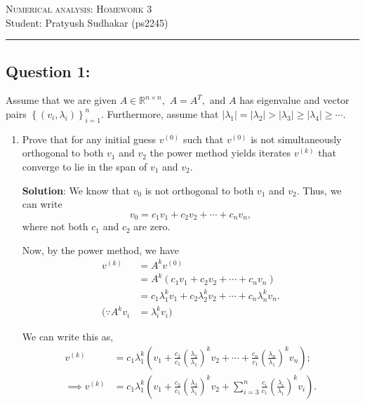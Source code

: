\documentclass[11pt,onecolumn]{article}
\begin{document}
\noindent
\textsc{\Large Numerical analysis: Homework 3}\\
Student: Pratyush Sudhakar (ps2245)\\
\hrule
\noindent

\subsection*{Question 1:}
Assume that we are given $A\in\mathbb{R}^{n\times n},$ $A=A^T,$ and $A$ has eigenvalue and vector pairs $\left\{(v_i,\lambda_i)\right\}_{i=1}^n.$ Furthermore, assume that $\lvert\lambda_1\rvert = \lvert\lambda_2\rvert > \lvert \lambda_3\rvert \geq \lvert\lambda_4\rvert \geq \cdots.$

\begin{enumerate}[label=(\alph*)]
    \item Prove that for any initial guess $v^{(0)}$ such that $v^{(0)}$ is not simultaneously orthogonal to both $v_1$ and $v_2$ the power method yields iterates $v^{(k)}$ that converge to lie in the span of $v_1$ and $v_2.$
          
          \textbf{Solution}:
          We know that $v_0$ is not orthogonal to both $v_1$ and $v_2$. Thus, we can write $$v_0 = c_1v_1 + c_2v_2 + \cdots + c_nv_n,$$ where not both $c_1$ and $c_2$ are zero.
          
          Now, by the power method, we have 
          \begin{align*}
              v^{(k)}          & = A^kv^{(0)}                                                          \\
                               & = A^k(c_1v_1 + c_2v_2 + \cdots + c_nv_n)                              \\
                               & = c_1\lambda_1^kv_1 + c_2\lambda_2^kv_2 + \cdots + c_n\lambda_n^kv_n. \\
              (\because A^kv_i & = \lambda_i^kv_i)                                              
          \end{align*}
          
          We can write this as,
          \begin{align*}
              v^{(k)}          & = c_1\lambda_1^k\left(v_1 + \frac{c_2}{c_1}\left(\frac{\lambda_2}{\lambda_1}\right)^kv_2 + \cdots + \frac{c_n}{c_1}\left(\frac{\lambda_n}{\lambda_1}\right)^kv_n\right);      \\
              \implies v^{(k)} & = c_1\lambda_1^k\left(v_1 + \frac{c_2}{c_1}\left(\frac{\lambda_2}{\lambda_1}\right)^kv_2 + \sum_{i=3}^{n}\frac{c_i}{c_1}\left(\frac{\lambda_i}{\lambda_1}\right)^kv_i\right).
          \end{align*}
          

\end{enumerate}
\end{document}
